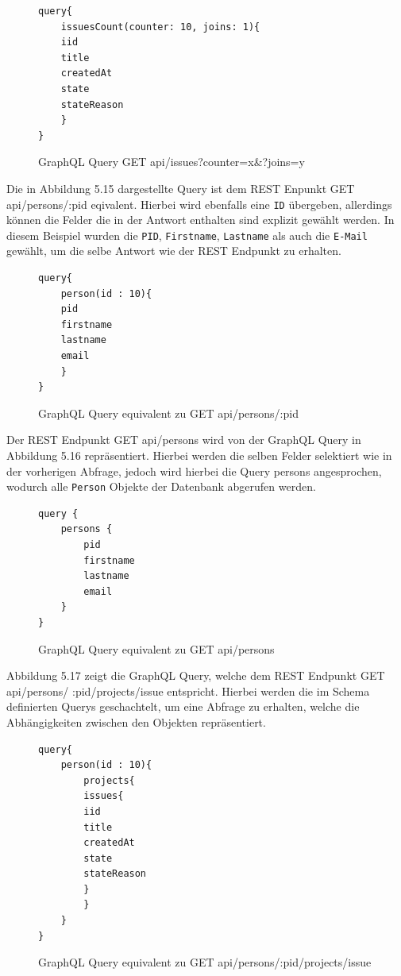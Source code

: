 \begin{figure}[H]
\begin{center}
\begin{BVerbatim}
query{
    issuesCount(counter: 10, joins: 1){
	iid
	title 
	createdAt 
	state 
	stateReason
    }
}
\end{BVerbatim}
\end{center}
\caption{GraphQL Query GET api/issues?counter=x\&?joins=y}
\end{figure}
\noindent
Die in Abbildung 5.15 dargestellte Query ist dem REST Enpunkt \colorbox{gray!20}{GET api/persons/:pid} eqivalent. Hierbei wird ebenfalls eine  \texttt{ID} übergeben, allerdings können die Felder die in der Antwort enthalten sind explizit gewählt werden. In diesem Beispiel wurden die  \texttt{PID},  \texttt{Firstname},  \texttt{Lastname} als auch die  \texttt{E-Mail} gewählt, um die selbe Antwort wie der REST Endpunkt zu erhalten. 
\begin{figure}[H]
\begin{center}
\begin{BVerbatim}
query{
    person(id : 10){
	pid
	firstname
	lastname
	email
    }
}
\end{BVerbatim}
\end{center}
\caption{GraphQL Query equivalent zu GET api/persons/:pid}
\end{figure}
\noindent
Der REST Endpunkt \colorbox{gray!20}{GET api/persons} wird von der GraphQL Query in Abbildung 5.16 repräsentiert. Hierbei werden die selben Felder selektiert wie in der vorherigen Abfrage, jedoch wird hierbei die Query \colorbox{gray!20}{persons} angesprochen, wodurch alle  \texttt{Person} Objekte der Datenbank abgerufen werden.
\begin{figure}[H]
\begin{center}
\begin{BVerbatim}
query {
    persons {
        pid
        firstname
        lastname
        email
    }
}
\end{BVerbatim}
\end{center}
\caption{GraphQL Query equivalent zu GET api/persons}
\end{figure}
\noindent
Abbildung 5.17 zeigt die GraphQL Query, welche dem REST Endpunkt \colorbox{gray!20}{GET api/persons/} \colorbox{gray!20}{:pid/projects/issue} entspricht. Hierbei werden die im Schema definierten Querys geschachtelt, um eine Abfrage zu erhalten, welche die Abhängigkeiten zwischen den Objekten repräsentiert.
\begin{figure}[H]
\begin{center}
\begin{BVerbatim}
query{
    person(id : 10){
        projects{
	    issues{
		iid
		title
		createdAt
		state
		stateReason
	    }
        }
    }
}
\end{BVerbatim}
\end{center}
\caption{GraphQL Query equivalent zu GET api/persons/:pid/projects/issue}
\end{figure}
